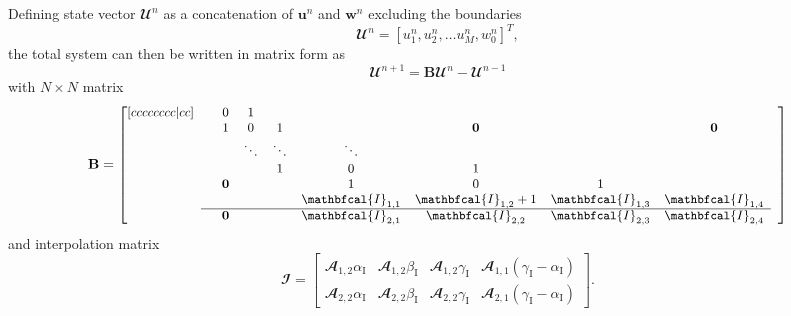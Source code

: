 \documentclass[dvipsnames, reprint]{JASA}
\begin{document}
Defining state vector $\mathbfcal{U}^n$ as a concatenation of $\mathbf{u}^n$ and $\mathbf{w}^n$ excluding the boundaries
\begin{equation}
    \mathbfcal{U}^n = [u_1^n, u_2^n, \hdots u_M^n, w_0^n]^T,
\end{equation}
the total system can then be written in matrix form as
\begin{equation}\label{eq:totalSystem}
    \mathbfcal{U}^{n+1} = 
    \mathbf{B} 
    \mathbfcal{U}^n
    - \mathbfcal{U}^{n-1}
\end{equation}
with $N \times N$ matrix
\begin{equation}\small
    \mathbf{B} = \begin{bmatrix}[cccccccc|cc]
    & & 0 & 1 & & & & & & \\
    & & 1 & 0 & 1 & & \mathbf{0} & &\mathbf{0} & \\
    & & &\ddots &\ddots & \ddots  & & & & \\
    & & & &1 & 0 & 1 & & & \\
    & & \mathbf{0} & &  & 1 & 0 & 1 & & \\
    & & & &  & \mathbfcal{I}_{1,1} &\mathbfcal{I}_{1,2} + 1 &\mathbfcal{I}_{1,3} & \mathbfcal{I}_{1,4}& \\ \cline{2-9}
    & & \mathbf{0} & & &\mathbfcal{I}_{2,1} &\mathbfcal{I}_{2,2}&\mathbfcal{I}_{2,3} & \mathbfcal{I}_{2,4} & 
    \end{bmatrix}
\end{equation}
%
and interpolation matrix
\begin{equation}
    \mathbfcal{I} = \begin{bmatrix}
        \mathbfcal{A}_{1,2}\alpha_\text{I}&   \mathbfcal{A}_{1,2}\beta_\text{I}&  \mathbfcal{A}_{1,2}\gamma_\text{I} &  \mathbfcal{A}_{1,1}(\gamma_\text{I} - \alpha_\text{I}) \\
        \mathbfcal{A}_{2,2}\alpha_\text{I}&   \mathbfcal{A}_{2,2}\beta_\text{I}&  \mathbfcal{A}_{2,2}\gamma_\text{I} &  \mathbfcal{A}_{2,1}(\gamma_\text{I} - \alpha_\text{I}) 
    \end{bmatrix}.\nonumber
\end{equation}
\end{document}
